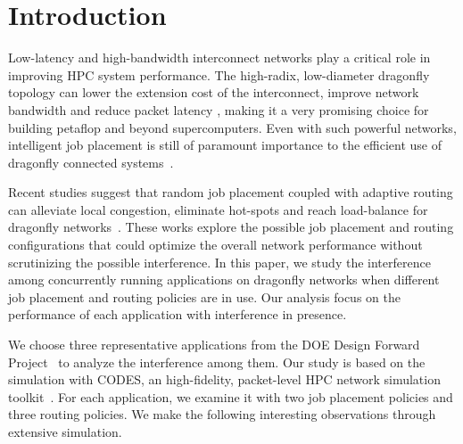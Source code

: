 \section{Introduction}
\label{sec:intro}

Low-latency and high-bandwidth interconnect networks play a critical role in improving HPC system performance. 
The high-radix, low-diameter dragonfly topology can lower the extension cost of the interconnect, improve network bandwidth and reduce packet latency \cite{dally-dragonfly}, 
making it a very promising choice for building petaflop and beyond supercomputers. 
Even with such powerful networks, 
intelligent job placement is still of paramount importance to the efficient use of dragonfly connected systems~\cite{bhatele2015, jain-sc14}. 

Recent studies suggest that random job placement coupled with adaptive routing can alleviate local congestion, eliminate hot-spots and reach load-balance for dragonfly networks~\cite{jain-sc14, bhatele-sc11, brandt2014}. 
These works explore the possible job placement and routing configurations that could optimize the overall network performance without scrutinizing the possible interference.
In this paper, we study the interference among concurrently running applications on dragonfly networks when different job placement and routing policies are in use. 
Our analysis focus on the performance of each application with interference in presence. 



We choose three representative applications from the DOE Design Forward Project~\cite{designforwardwebpage} to analyze the interference among them. Our study is based on the simulation with CODES, an high-fidelity, packet-level HPC network simulation toolkit~\cite{codes}.
For each application, we examine it with two job placement policies and three routing policies.
We make the following interesting observations through extensive simulation.


